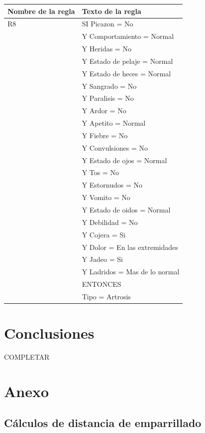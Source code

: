 \documentclass[a4paper,table,xcdraw]{article}
\begin{document}
\begin{table}[H]
\centering
\begin{tabular}{|l|l|}
\hline
\textbf{Nombre de la regla} & Texto de la regla \\ \hline
R8 & SI Picazon = No \\
  & Y Comportamiento = Normal \\
  & Y Heridas = No \\
  & Y Estado de pelaje = Normal \\
  & Y Estado de heces = Normal \\
  & Y Sangrado = No \\
  & Y Paralisis = No \\
  & Y Ardor = No \\
  & Y Apetito = Normal \\
  & Y Fiebre = No \\
  & Y Convulsiones = No \\
  & Y Estado de ojos = Normal \\
  & Y Tos = No \\
  & Y Estornudos = No \\
  & Y Vomito = No \\
  & Y Estado de oidos = Normal \\
  & Y Debilidad = No \\
  & Y Cojera = Si \\
  & Y Dolor = En las extremidades \\
  & Y Jadeo = Si \\
  & Y Ladridos = Mas de lo normal \\
  &   ENTONCES \\
  & Tipo = Artrosis \\ \hline
\end{tabular}
\end{table}

\section{Conclusiones}
COMPLETAR

\section{Anexo}

\subsection{Cálculos de distancia de emparrillado}
\end{document}
